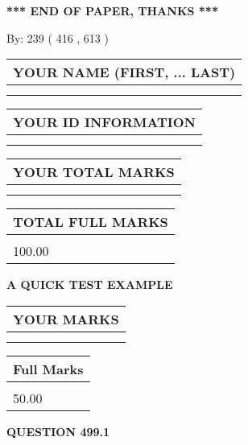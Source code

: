 \documentclass[12pt]{article}
\begin{document}
\vspace{1.0in} 
{\textbf{\large{ *** END OF PAPER, THANKS *** }}} 
   
   
\hspace{1.0in} By: 
 239 ( 416 ,  613 )
   
   
   
   
\newpage 
\setcounter{page}{ 
   499001 } 
   
   
   
   
\noindent\begin{tabular}{|l|}
\hline
YOUR NAME (FIRST, ... LAST)  \\
\hline
 \\ 
 \\ 
\hline
\end{tabular}
\hspace{0.05in} \begin{tabular}{|l|}
\hline
 YOUR   ID   INFORMATION  \\
\hline
 \\ 
 \\ 
\hline
\end{tabular}
   
   
\vspace{0.2in}\noindent\begin{tabular}{|l|}
\hline
YOUR TOTAL MARKS  \\
\hline
 \\ 
 \\ 
\hline
\end{tabular}
\hspace{0.05in} \begin{tabular}{|l|}
\hline
TOTAL FULL MARKS  \\
\hline
 \\ 
100.00 \\
\hline
\end{tabular}
   
   
 \vspace{0.2in}
{\LARGE {\textbf{ A QUICK TEST EXAMPLE}}}
   
   
  
\vspace{0.2in}
  
\noindent\begin{tabular}{|l|}
\hline
 YOUR MARKS  \\
\hline
 \\ 
 \\ 
\hline
\end{tabular}
\hspace{0.05in} \begin{tabular}{|l|}
\hline
 Full Marks  \\
\hline
 \\ 
50.00 \\
\hline
\end{tabular}
{\textbf{\Large{QUESTION
499.1 
}}}
  
\end{document}

